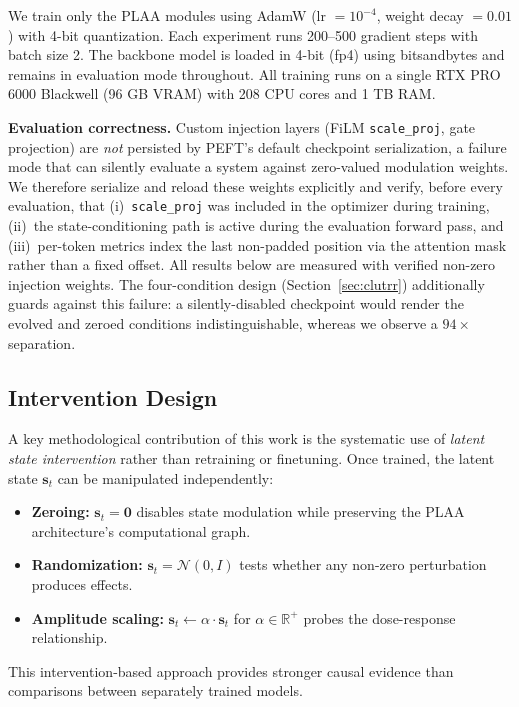 \documentclass[11pt,a4paper]{article}
\begin{document}
We train only the PLAA modules using AdamW (lr $= 10^{-4}$, weight decay $= 0.01$) with 4-bit quantization. Each experiment runs 200--500 gradient steps with batch size 2. The backbone model is loaded in 4-bit (fp4) using bitsandbytes and remains in evaluation mode throughout. All training runs on a single RTX PRO 6000 Blackwell (96 GB VRAM) with 208 CPU cores and 1 TB RAM.

\textbf{Evaluation correctness.} Custom injection layers (FiLM \texttt{scale\_proj}, gate projection) are \emph{not} persisted by PEFT's default checkpoint serialization, a failure mode that can silently evaluate a system against zero-valued modulation weights. We therefore serialize and reload these weights explicitly and verify, before every evaluation, that (i)~\texttt{scale\_proj} was included in the optimizer during training, (ii)~the state-conditioning path is active during the evaluation forward pass, and (iii)~per-token metrics index the last non-padded position via the attention mask rather than a fixed offset. All results below are measured with verified non-zero injection weights. The four-condition design (Section~\ref{sec:clutrr}) additionally guards against this failure: a silently-disabled checkpoint would render the evolved and zeroed conditions indistinguishable, whereas we observe a $94\times$ separation.

\subsection{Intervention Design}

A key methodological contribution of this work is the systematic use of \textit{latent state intervention} rather than retraining or finetuning. Once trained, the latent state $\mathbf{s}_t$ can be manipulated independently:

\begin{itemize}
    \item \textbf{Zeroing:} $\mathbf{s}_t = \mathbf{0}$ disables state modulation while preserving the PLAA architecture's computational graph.
    \item \textbf{Randomization:} $\mathbf{s}_t = \mathcal{N}(0, I)$ tests whether any non-zero perturbation produces effects.
    \item \textbf{Amplitude scaling:} $\mathbf{s}_t \leftarrow \alpha \cdot \mathbf{s}_t$ for $\alpha \in \mathbb{R}^+$ probes the dose-response relationship.
\end{itemize}

This intervention-based approach provides stronger causal evidence than comparisons between separately trained models.
\end{document}
